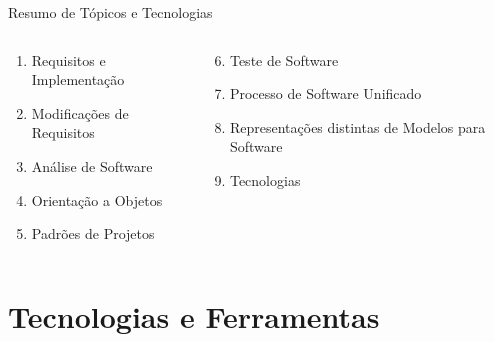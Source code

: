 \documentclass[aspectratio=169]{beamer}
\begin{document}
\begin{frame}{Resumo de Tópicos e Tecnologias}
\begin{columns}
\begin{column}{0.5\textwidth}
\begin{enumerate}
    \item Requisitos e Implementação
    \item Modificações de Requisitos
    \item Análise de Software
    \item Orientação a Objetos
    \item Padrões de Projetos
\end{enumerate}
\end{column}
\begin{column}{0.5\textwidth}
\begin{enumerate}
    \setcounter{enumi}{5}
    \item Teste de Software
    \item Processo de Software Unificado
    \item Representações distintas de Modelos para Software
    \item Tecnologias
\end{enumerate}
\end{column}
\end{columns}


\end{frame}

\section{Tecnologias e Ferramentas}
\end{document}
